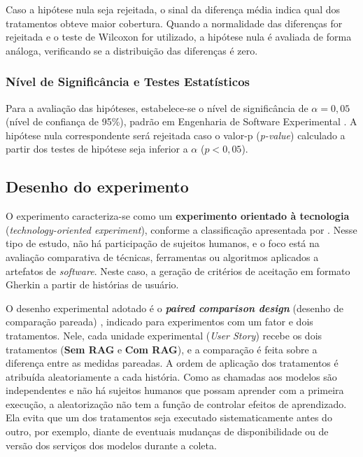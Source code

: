 Caso a hipótese nula seja rejeitada, o sinal da diferença média indica qual dos tratamentos obteve maior cobertura. Quando a normalidade das diferenças for rejeitada e o teste de Wilcoxon for utilizado, a hipótese nula é avaliada de forma análoga, verificando se a distribuição das diferenças é zero.


\subsubsection*{Nível de Significância e Testes Estatísticos}

Para a avaliação das hipóteses, estabelece-se o nível de significância de $\alpha = 0{,}05$ (nível de confiança de 95\%), padrão em Engenharia de Software Experimental \cite{wohlin2000}. A hipótese nula correspondente será rejeitada caso o valor-p (\textit{p-value}) calculado a partir dos testes de hipótese seja inferior a $\alpha$ ($p < 0{,}05$). 

\subsection{Desenho do experimento}
O experimento caracteriza-se como um \textbf{experimento orientado à tecnologia} (\textit{technology-oriented experiment}), conforme a classificação apresentada por . Nesse tipo de estudo, não há participação de sujeitos humanos, e o foco está na avaliação comparativa de técnicas, ferramentas ou algoritmos aplicados a artefatos de \textit{software}. Neste caso, a geração de critérios de aceitação em formato Gherkin a partir de histórias de usuário.

O desenho experimental adotado é o \textbf{\textit{paired comparison design}} (desenho de comparação pareada) \cite{wohlin2000}, indicado para experimentos com um fator e dois tratamentos. Nele, cada unidade experimental (\textit{User Story}) recebe os dois tratamentos (\textbf{Sem RAG} e \textbf{Com RAG}), e a comparação é feita sobre a diferença entre as medidas pareadas. A ordem de aplicação dos tratamentos é atribuída aleatoriamente a cada história. Como as chamadas aos modelos são independentes e não há sujeitos humanos que possam aprender com a primeira execução, a aleatorização não tem a função de controlar efeitos de aprendizado. Ela evita que um dos tratamentos seja executado sistematicamente antes do outro, por exemplo, diante de eventuais mudanças de disponibilidade ou de versão dos serviços dos modelos durante a coleta.

